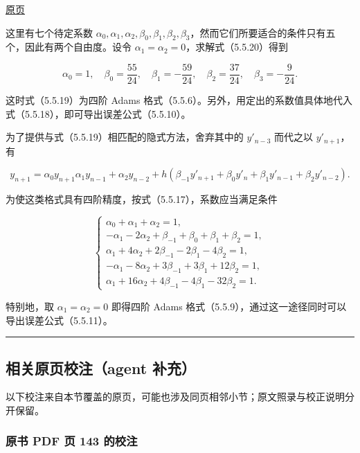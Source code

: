 \documentclass[
  10pt,
  fontset=fandol]{ctexart}
\begin{document}
\href{../../source-images/pdf-143.jpeg}{原页}

这里有七个待定系数 \(\alpha_0,\allowbreak \alpha_1,\allowbreak \alpha_2,\allowbreak \beta_0,\allowbreak \beta_1,\allowbreak \beta_2,\allowbreak \beta_3\)，然而它们所要适合的条件只有五个，因此有两个自由度。设令 \(\alpha_1=\alpha_2=0\)，求解式（5.5.20）得到

\[
\alpha_0=1,\quad\beta_0=\frac{55}{24},\quad\beta_1=-\frac{59}{24},\quad\beta_2=\frac{37}{24},\quad\beta_3=-\frac9{24}.
\]

这时式（5.5.19）为四阶 Adams 格式（5.5.6）。另外，用定出的系数值具体地代入式（5.5.18），即可导出误差公式（5.5.10）。

为了提供与式（5.5.19）相匹配的隐式方法，舍弃其中的 \(y'_{n-3}\) 而代之以 \(y'_{n+1}\)，有

\[
y_{n+1}=\alpha_0y_{n+1}\alpha_1y_{n-1}+\alpha_2y_{n-2}+h(\beta_{-1}y'_{n+1}+\beta_0y'_n+\beta_1y'_{n-1}+\beta_2y'_{n-2}).
\tag{5.5.21}
\]

为使这类格式具有四阶精度，按式（5.5.17），系数应当满足条件

\[
\begin{cases}
\alpha_0+\alpha_1+\alpha_2=1,\\
-\alpha_1-2\alpha_2+\beta_{-1}+\beta_0+\beta_1+\beta_2=1,\\
\alpha_1+4\alpha_2+2\beta_{-1}-2\beta_1-4\beta_2=1,\\
-\alpha_1-8\alpha_2+3\beta_{-1}+3\beta_1+12\beta_2=1,\\
\alpha_1+16\alpha_2+4\beta_{-1}-4\beta_1-32\beta_2=1.
\end{cases}
\tag{5.5.22}
\]

特别地，取 \(\alpha_1=\alpha_2=0\) 即得四阶 Adams 格式（5.5.9），通过这一途径同时可以导出误差公式（5.5.11）。

\begin{center}\rule{0.5\linewidth}{0.5pt}\end{center}

\subsection{相关原页校注（agent 补充）}\label{ux76f8ux5173ux539fux9875ux6821ux6ce8agent-ux8865ux5145}

以下校注来自本节覆盖的原页，可能也涉及同页相邻小节；原文照录与校正说明分开保留。

\subsubsection{原书 PDF 页 143 的校注}\label{ux539fux4e66-pdf-ux9875-143-ux7684ux6821ux6ce8}
\end{document}
